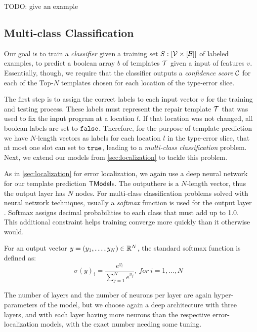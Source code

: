TODO: give an example


\subsection{Multi-class Classification}
\label{subsec:multi-class}
Our goal is to train a \emph{classifier} given a training set $S : [\mathcal{V}
\times [\mathcal{B}]]$ of labeled examples, to predict a boolean array $b$ of
templates $\mathcal{T}$ given a input of features $v$. Essentially, though, we require
that the classifier outputs a \emph{confidence score} $\mathcal{C}$ for each of the
Top-$N$ templates chosen for each location of the type-error slice.

The first step is to assign the correct labels to each input vector $v$ for the
training and testing process. These labels must represent the repair template
$\mathcal{T}$ that was used to fix the input program at a location $l$. If that location
was not changed, all boolean labels are set to $\mathtt{false}$. Therefore, for the
purpose of template prediction we have $N$-length vectors as labels for each
location $l$ in the type-error slice, that at most one slot can set to $\mathtt{true}$,
leading to a \emph{multi-class classification} problem. Next, we extend our
models from \autoref{sec:localization} to tackle this problem.

As in \autoref{sec:localization} for error localization, we again use a deep
neural network for our template prediction $\mathsf{TModel}$s. The outputhere is a
$N$-length vector, thus the output layer has $N$ nodes. For multi-class
classification problems solved with neural network techniques, usually a
\emph{softmax} function is used for the output layer
\citep[][]{Goodfellow-et-al-2016, Bishop-book-2006}. Softmax assigns decimal
probabilities to each class that must add up to 1.0. This additional constraint
helps training converge more quickly than it otherwise would.

For an output vector $y = (y_1, \dots, y_N) \in \mathbb{R}^{N}$, the standard softmax
function is defined as:
\[ \sigma(y)_i = \frac{e^{y_i}}{\sum_{j=1}^{N} e^{y_j}},\ for\ i = 1, \dots, N \]

The number of layers and the number of neurons per layer are again
hyper-parameters of the model, but we choose again a deep architecture with
three layers, and with each layer having more neurons than the respective
error-localization models, with the exact number needing some tuning.

